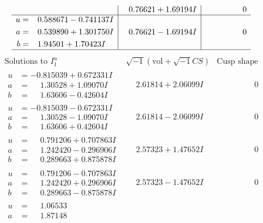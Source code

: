 \documentclass[1p]{elsarticle_modified}
\theoremstyle{definition}
\newcommand{\I}{\sqrt{-1}}
\begin{document}
$$\begin{array}{c|c|c}
 & \phantom{-}0.76621 + 1.69194 I & \phantom{-0.000000 } 0 \\ \hline\begin{aligned}
u &= \phantom{-}0.588671 - 0.741137 I \\
a &= \phantom{-}0.539890 + 1.301750 I \\
b &= \phantom{-}1.94501 + 1.70423 I\end{aligned}
 & \phantom{-}0.76621 - 1.69194 I & \phantom{-0.000000 } 0\\
 \hline 
 \end{array}$$\newpage$$\begin{array}{c|c|c}  
\text{Solutions to }I^u_{1}& \I (\text{vol} + \sqrt{-1}CS) & \text{Cusp shape}\\
 \hline 
\begin{aligned}
u &= -0.815039 + 0.672331 I \\
a &= \phantom{-}1.30528 + 1.09070 I \\
b &= \phantom{-}1.63606 - 0.42604 I\end{aligned}
 & \phantom{-}2.61814 + 2.06099 I & \phantom{-0.000000 } 0 \\ \hline\begin{aligned}
u &= -0.815039 - 0.672331 I \\
a &= \phantom{-}1.30528 - 1.09070 I \\
b &= \phantom{-}1.63606 + 0.42604 I\end{aligned}
 & \phantom{-}2.61814 - 2.06099 I & \phantom{-0.000000 } 0 \\ \hline\begin{aligned}
u &= \phantom{-}0.791206 + 0.707863 I \\
a &= \phantom{-}1.242420 - 0.296906 I \\
b &= \phantom{-}0.289663 + 0.875878 I\end{aligned}
 & \phantom{-}2.57323 + 1.47652 I & \phantom{-0.000000 } 0 \\ \hline\begin{aligned}
u &= \phantom{-}0.791206 - 0.707863 I \\
a &= \phantom{-}1.242420 + 0.296906 I \\
b &= \phantom{-}0.289663 - 0.875878 I\end{aligned}
 & \phantom{-}2.57323 - 1.47652 I & \phantom{-0.000000 } 0 \\ \hline\begin{aligned}
u &= \phantom{-}1.06533\phantom{ +0.000000I} \\
a &= \phantom{-}1.87148\phantom{ +0.000000I} \\

\end{aligned}
\end{array}$$
\end{document}

